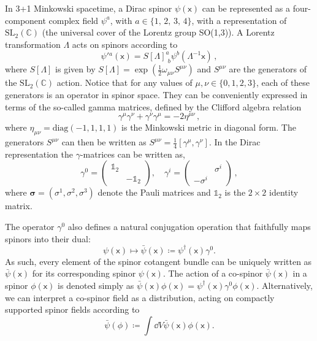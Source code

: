 \documentclass[letterpaper,12pt,titlepage,oneside,final]{book}
\newcommand{\openone}{\mathds{1}}
\newcommand{\mf}{\mathsf}%
\begin{document}
In 3+1 Minkowski spacetime, a Dirac spinor $\psi(\mathsf{x})$ can be represented as a four-component complex field $\psi^a$, with $a \in \{1,\,2,\,3,\,4\}$, with a representation of $\text{SL}_2(\mathbb{C})$ (the universal cover of the Lorentz group SO(1,3)). A Lorentz transformation $\Lambda$ acts on spinors according to
\begin{equation}
    \psi'{}^a(\mf x) = S[\Lambda]^a_{\,\,b}\psi^b(\Lambda^{-1}\mf x) \,,
\end{equation}
where $S[\Lambda]$ is given by $S[\Lambda] = \exp(\frac{1}{2}\omega_{\mu\nu}S^{\mu\nu})$ and $S^{\mu\nu}$ are the generators of the $\text{SL}_2(\mathbb{C})$ action. Notice that for any values of $\mu,\nu\in\{0,1,2,3\}$, each of these generators is an operator in spinor space. They can be conveniently expressed in terms of the so-called gamma matrices, defined by the Clifford algebra relation
\begin{equation}
    \gamma^\mu\gamma^\nu + \gamma^\nu\gamma^\mu = -2\eta^{\mu\nu} \, ,
\end{equation}
where $\eta_{\mu\nu} = \text{diag}(-1,1,1,1)$ is the Minkowski metric in diagonal form. The generators $S^{\mu\nu}$ can then be written as \mbox{$S^{\mu\nu} = \frac{1}{4}[\gamma^\mu, \gamma^\nu]$}. In the Dirac representation the $\gamma$-matrices can be written as,
\begin{equation}\label{gammamatrices} 
\gamma^0=\begin{pmatrix}
\mathds{1}_2 & \\
& -\mathds{1}_2
\end{pmatrix}, \quad 
\gamma^i=\begin{pmatrix}
  & \sigma^i \\
-\sigma^i & 
\end{pmatrix} \, ,
\end{equation}
where $\bm \sigma = (\sigma^1,\sigma^2,\sigma^3)$ denote the Pauli matrices and $\openone_2$ is the $2\times2$ identity matrix. 

The operator $\gamma^0$ also defines a natural conjugation operation that faithfully maps spinors into their dual:
\begin{equation}
    \psi(\mf x) \mapsto \bar{\psi}(\mf x) \coloneqq \psi^\dagger(\mf x) \gamma^0.
\end{equation}
As such, every element of the spinor cotangent bundle can be uniquely written as $\bar{\psi}(\mf x)$ for its corresponding spinor $\psi(\mf x)$. The action of a co-spinor $\bar{\psi}(\mf x)$ in a spinor $\phi(\mf x)$ is denoted simply as $\bar{\psi}(\mf x)\phi(\mf x) = \psi^\dagger(\mf x)\gamma^0\phi(\mf x)$. Alternatively, we can interpret a co-spinor field as a distribution, acting on compactly supported spinor fields according to
\begin{equation}
    \bar{\psi}(\phi) \coloneqq \int \dd V \bar{\psi}(\mf x) \phi(\mf x).
\end{equation}
\end{document}
